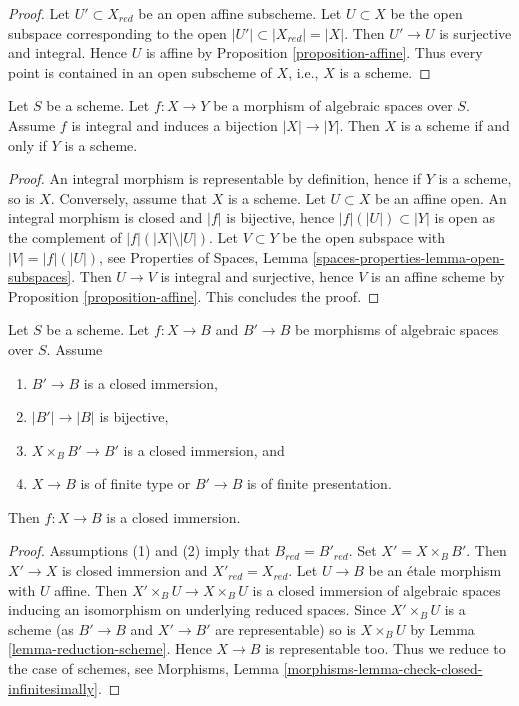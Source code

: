 \begin{proof}
Let $U' \subset X_{red}$ be an open affine subscheme.
Let $U \subset X$ be the open subspace corresponding to the open
$|U'| \subset |X_{red}| = |X|$. Then $U' \to U$ is surjective and
integral. Hence $U$ is affine by
Proposition \ref{proposition-affine}.
Thus every point is contained in an open subscheme of $X$, i.e.,
$X$ is a scheme.
\end{proof}

\begin{lemma}
\label{lemma-integral-universally-bijective-scheme}
Let $S$ be a scheme. Let $f : X \to Y$ be a morphism of algebraic spaces
over $S$. Assume $f$ is integral and induces a bijection $|X| \to |Y|$.
Then $X$ is a scheme if and only if $Y$ is a scheme.
\end{lemma}

\begin{proof}
An integral morphism is representable by definition, hence if $Y$
is a scheme, so is $X$. Conversely, assume that $X$ is a scheme.
Let $U \subset X$ be an affine open. An integral morphism is
closed and $|f|$ is bijective, hence $|f|(|U|) \subset |Y|$
is open as the complement of $|f|(|X| \setminus |U|)$. Let
$V \subset Y$ be the open subspace with $|V| = |f|(|U|)$, see
Properties of Spaces, Lemma \ref{spaces-properties-lemma-open-subspaces}.
Then $U \to V$ is integral and surjective, hence
$V$ is an affine scheme by Proposition \ref{proposition-affine}.
This concludes the proof.
\end{proof}

\begin{lemma}
\label{lemma-check-closed-infinitesimally}
Let $S$ be a scheme.
Let $f : X \to B$ and $B' \to B$ be morphisms of algebraic spaces over $S$.
Assume
\begin{enumerate}
\item $B' \to B$ is a closed immersion,
\item $|B'| \to |B|$ is bijective,
\item $X \times_B B' \to B'$ is a closed immersion, and
\item $X \to B$ is of finite type or $B' \to B$ is of finite presentation.
\end{enumerate}
Then $f : X \to B$ is a closed immersion.
\end{lemma}

\begin{proof}
Assumptions (1) and (2) imply that $B_{red} = B'_{red}$.
Set $X' = X \times_B B'$. Then $X' \to X$ is closed immersion
and $X'_{red} = X_{red}$. Let $U \to B$ be an \'etale morphism
with $U$ affine. Then $X' \times_B U \to X \times_B U$ is a
closed immersion of algebraic spaces inducing an isomorphism
on underlying reduced spaces. Since $X' \times_B U$ is a scheme
(as $B' \to B$ and $X' \to B'$ are representable) so is
$X \times_B U$ by Lemma \ref{lemma-reduction-scheme}.
Hence $X \to B$ is representable too. Thus we reduce to the
case of schemes, see
Morphisms, Lemma \ref{morphisms-lemma-check-closed-infinitesimally}.
\end{proof}










